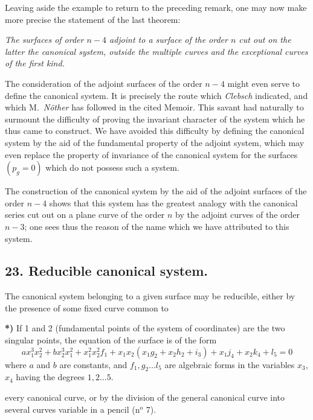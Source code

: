 \documentclass{article}
\begin{document}
Leaving aside the example to return to the preceding remark, one may now make more precise the statement of the last theorem:

\emph{The surfaces of order $n-4$ adjoint to a surface of the order $n$ cut out on the latter the canonical system, outside the multiple curves and the exceptional curves of the first kind.}

The consideration of the adjoint surfaces of the order $n-4$ might even serve to define the canonical system. It is precisely the route which \emph{Clebsch} indicated, and which M.\ \emph{Nöther} has followed in the cited Memoir. This savant had naturally to surmount the difficulty of proving the invariant character of the system which he thus came to construct. We have avoided this difficulty by defining the canonical system by the aid of the fundamental property of the adjoint system, which may even replace the property of invariance of the canonical system for the surfaces $(p_{g} = 0)$ which do not possess such a system.

The construction of the canonical system by the aid of the adjoint surfaces of the order $n-4$ shows that this system has the greatest analogy with the canonical series cut out on a plane curve of the order $n$ by the adjoint curves of the order $n-3$; one sees thus the reason of the name which we have attributed to this system.

\subsection*{23. Reducible canonical system.}

The canonical system belonging to a given surface may be reducible, either by the presence of some fixed curve common to

\textbf{*)} If 1 and 2 (fundamental points of the system of coordinates) are the two singular points, the equation of the surface is of the form
\[
a x_{1}^{3} x_{2}^{2} + b x_{2}^{3} x_{1}^{2} + x_{1}^{2} x_{2}^{2} f_{1} + x_{1} x_{2} (x_{1} g_{2} + x_{2} h_{2} + i_{3}) + x_{1} j_{4} + x_{2} k_{4} + l_{5} = 0
\]
where $a$ and $b$ are constants, and $f_{1}, g_{2} \ldots l_{5}$ are algebraic forms in the variables $x_{3}$, $x_{4}$ having the degrees $1, 2 \ldots 5$.

every canonical curve, or by the division of the general canonical curve into several curves variable in a pencil (n${}^{\text{o}}$ 7).
\end{document}

